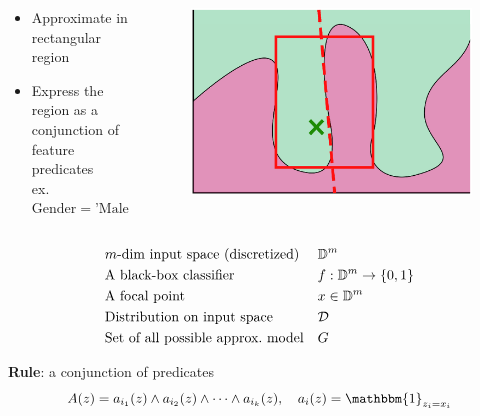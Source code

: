 \documentclass[aspectratio=169]{slide-en}
\begin{document}
\begin{frame}{}
  \begin{columns}[]
    \begin{column}{0.45\textwidth}

      \bigskip
      \begin{itemize}
        \item Approximate in rectangular region
        \item Express the region as a conjunction of feature predicates \\
              \smallskip
              \footnotesize{
                ex. $\textrm{Gender} = \textrm{'Male' AND } 20\le\textrm{Age} < 30$
              }
      \end{itemize}
    \end{column}
    \begin{column}{0.55\textwidth}
      \begin{figure}
        \includegraphics[scale=0.35]{img/visual-rlime3}
      \end{figure}
    \end{column}
  \end{columns}
\end{frame}

\begin{frame}{}
  \vspace{-1.4em}
  \begin{align*}
     & \text{$m$-dim input space (discretized)}  &  & \mathbb{D}^{m}             \\
     & \text{A black-box classifier}             &  & f:\mathbb{D}^{m}\to\{0,1\} \\
     & \text{A focal point}                      &  & x\in\mathbb{D}^{m}         \\
     & \text{Distribution on input space}        &  & \mathcal{D}         \\
     & \text{Set of all possible approx.\ model} &  & G
  \end{align*}

  \textbf{Rule}: a conjunction of predicates
  \vspace{-0.5em}
  \begin{equation*}
    A(z)=a_{i_1}(z)\wedge a_{i_2}(z)\wedge\dots\wedge a_{i_k}(z),\quad
    a_i(z)=\mathbbm{1}_{z_i=x_i}
  \end{equation*}
\end{frame}
\end{document}
